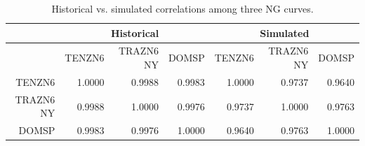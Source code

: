 \begin{table}[htbp]
\begin{center}
\caption{Historical vs. simulated correlations among three NG curves.}
\begin{tabular}{rrrr|rrr}
  \hline
 &  \multicolumn{3}{c|}{Historical} &  \multicolumn{3}{|c}{Simulated} \\ \hline
 & TENZN6  & TRAZN6 NY  & DOMSP  & TENZN6  & TRAZN6 NY  & DOMSP  \\
  \hline
TENZN6  & 1.0000 & 0.9988 & 0.9983 & 1.0000 & 0.9737 & 0.9640 \\
  TRAZN6 NY  & 0.9988 & 1.0000 & 0.9976 & 0.9737 & 1.0000 & 0.9763 \\
  DOMSP  & 0.9983 & 0.9976 & 1.0000 & 0.9640 & 0.9763 & 1.0000 \\
   \hline
\end{tabular}
\end{center}
\label{tbl-ng-cor}
\end{table}

